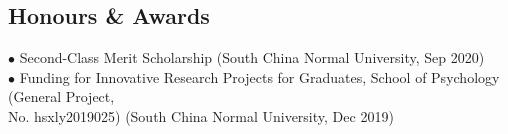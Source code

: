 \documentclass[a4paper, 10pt]{article}
\begin{document}
\subsection*{Honours \& Awards}

$\bullet$\hspace{1.8em} Second-Class Merit Scholarship (South China Normal University, Sep 2020) \\
$\bullet$\hspace{1.8em} Funding for Innovative Research Projects for Graduates, School of Psychology (General Project, \\ \indent\hspace{2.3em} No. hsxly2019025) (South China Normal University, Dec 2019)\\

\bigskip







\end{document}
